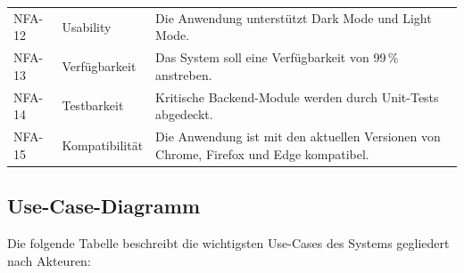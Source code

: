 \begin{table}[H]
\begin{tabularx}{\textwidth}{llX}
        NFA-12 & Usability
          & Die Anwendung unterstützt Dark Mode und Light Mode. \\
        NFA-13 & Verfügbarkeit
          & Das System soll eine Verfügbarkeit von 99\,\% anstreben. \\
        NFA-14 & Testbarkeit
          & Kritische Backend-Module werden durch Unit-Tests
            abgedeckt. \\
        NFA-15 & Kompatibilität
          & Die Anwendung ist mit den aktuellen Versionen von
            Chrome, Firefox und Edge kompatibel. \\
        \bottomrule
    \end{tabularx}
    \label{tab:nfa}
\end{table}

\subsection{Use-Case-Diagramm}
\label{sec:use-cases}

Die folgende Tabelle beschreibt die wichtigsten Use-Cases des Systems
gegliedert nach Akteuren:


